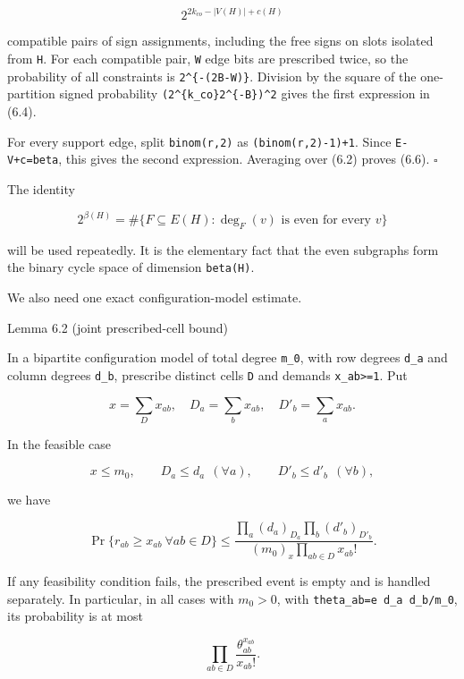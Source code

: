 \documentclass[
  11pt,
  a4paper,
]{article}
\begin{document}
\[
 2^{2k_{co}-|V(H)|+c(H)}
\]

compatible pairs of sign assignments, including the free signs on slots
isolated from \texttt{H}. For each compatible pair, \texttt{W} edge bits
are prescribed twice, so the probability of all constraints is
\texttt{2\^{}\{-(2B-W)\}}. Division by the square of the one-partition
signed probability
\texttt{(2\^{}\{k\_}\allowbreak{}\texttt{co\}2\^{}\{-B\})}\allowbreak{}\texttt{\^{}2}
gives the first expression in (6.4).

For every support edge, split \texttt{binom(r,2)} as
\texttt{(binom(r,2)-1)+1}. Since
\texttt{\textbar{}E\textbar{}-\textbar{}V\textbar{}+c=beta}, this gives
the second expression. Averaging over (6.2) proves (6.6). \(\square\)

The identity

\[
 2^{\beta(H)}
 =\#\{F\subseteq E(H):\deg_F(v)\text{ is even for every }v\} \tag{6.7}
\]

will be used repeatedly. It is the elementary fact that the even
subgraphs form the binary cycle space of dimension \texttt{beta(H)}.

We also need one exact configuration-model estimate.

{}
\label{lemma-6.2-joint-prescribed-cell-bound}
\begin{lemmabox}{Lemma 6.2 (joint prescribed-cell bound)}

In a bipartite configuration model of total degree \texttt{m\_0}, with
row degrees \texttt{d\_a} and column degrees
\texttt{d\textquotesingle{}\_b}, prescribe distinct cells \texttt{D} and
demands \texttt{x\_ab\textgreater{}=1}. Put

\[
 x=\sum_Dx_{ab},\quad D_a=\sum_bx_{ab},\quad
 D'_b=\sum_ax_{ab}.
\]

In the feasible case

\[
 x\le m_0,\qquad D_a\le d_a\ \ (\forall a),\qquad
 D'_b\le d'_b\ \ (\forall b),
\]

we have

\[
 \Pr\{r_{ab}\ge x_{ab}\ \forall ab\in D\}
 \le\frac{\prod_a(d_a)_{D_a}\prod_b(d'_b)_{D'_b}}
          {(m_0)_x\prod_{ab\in D}x_{ab}!}.               \tag{6.8}
\]

If any feasibility condition fails, the prescribed event is empty and is
handled separately. In particular, in all cases with \(m_0>0\), with
\texttt{theta\_}\allowbreak{}\texttt{ab=}\allowbreak{}\texttt{e\ d\_}\allowbreak{}\texttt{a\ d\textquotesingle{}\_}\allowbreak{}\texttt{b/}\allowbreak{}\texttt{m\_}\allowbreak{}\texttt{0},
its probability is at most

\[
 \prod_{ab\in D}\frac{\theta_{ab}^{x_{ab}}}{x_{ab}!}.  \tag{6.9}
\]

\end{lemmabox}
\end{document}

